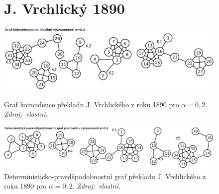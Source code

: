 \documentclass[dp.tex]{subfiles}
\begin{document}
\begin{figure}[h]
\section*{J. Vrchlický 1890}
	\centering
	\includegraphics[max width=\textwidth,keepaspectratio=true]{imgs-99-priloha-d/c_k_20}
	\caption[Graf koincidence překladu J. Vrchlického z roku 1890 pro $\alpha = 0{,}2$]
            {Graf koincidence překladu J. Vrchlického z roku 1890 pro $\alpha = 0{,}2$. \textit{Zdroj:~vlastní.}}
	\label{fig:c_k_20}

	\includegraphics[max width=\textwidth,keepaspectratio=true]{imgs-99-priloha-d/c_d_20}
	\caption[Deterministicko-pravděpodobnostní graf překladu J. Vrchlického z roku 1890 pro $\alpha = 0{,}2$]
            {Deterministicko-pravděpodobnostní graf překladu J. Vrchlického z roku 1890 pro $\alpha = 0{,}2$. \textit{Zdroj:~vlastní.}}
	\label{fig:c_d_20}
\end{figure}
\end{document}
